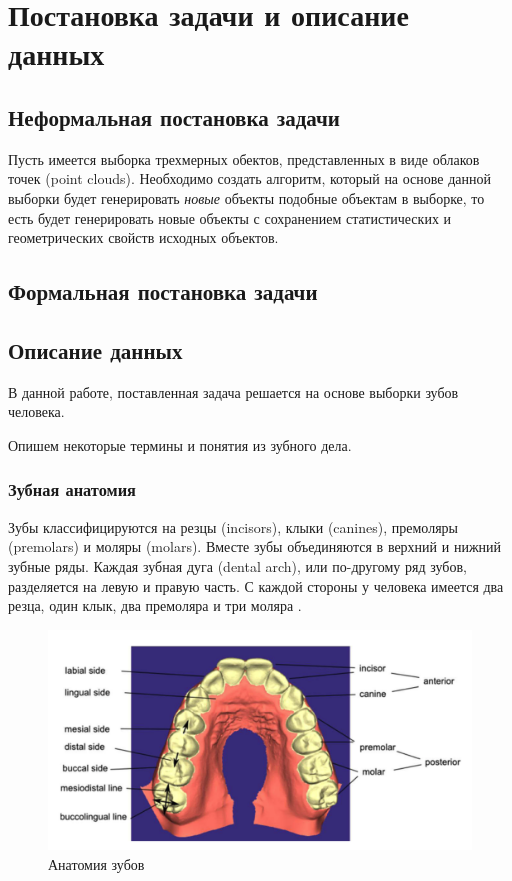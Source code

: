 \section{Постановка задачи и описание данных} \label{section:task}

\subsection{Неформальная постановка задачи}
Пусть имеется выборка трехмерных обектов, представленных в виде облаков точек (point clouds). Необходимо создать алгоритм, который на основе данной выборки будет генерировать \textit{новые} объекты подобные объектам в выборке, то есть будет генерировать новые объекты с сохранением статистических и геометрических свойств исходных объектов.

\subsection{Формальная постановка задачи}

\subsection{Описание данных}

В данной работе, поставленная задача решается на основе выборки зубов человека.

Опишем некоторые термины и понятия из зубного дела.

\subsubsection{Зубная анатомия}

Зубы классифицируются на резцы (incisors), клыки (canines), премоляры (premolars) и моляры (molars). Вместе зубы объединяются в верхний и нижний зубные ряды. Каждая зубная дуга (dental arch), или по-другому ряд зубов, разделяется на левую и правую часть. С каждой стороны у человека имеется два резца, один клык, два премоляра и три моляра \cite{kumar}.

\begin{figure}[h]
\includegraphics[width=1\linewidth]{images/dental_parts.png}
\caption{Анатомия зубов}
\label{fig:dental_parts}
\end{figure}

